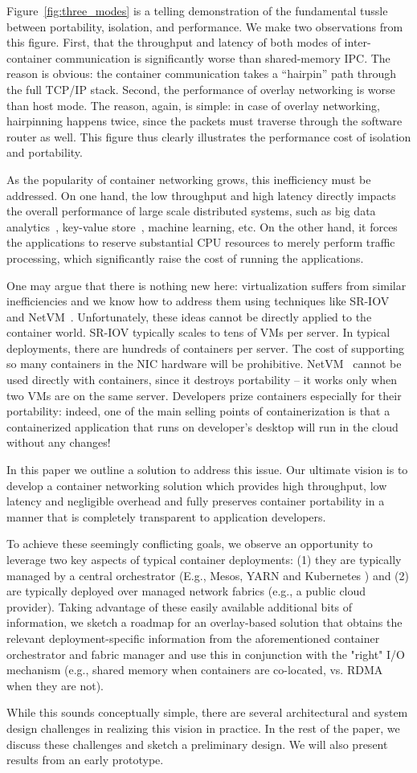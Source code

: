 Figure~\ref{fig:three_modes} is a telling demonstration of the fundamental
tussle between portability, isolation, and performance. We make two
observations from this figure. First, that the throughput and latency of both
modes of inter-container communication is significantly worse than
shared-memory IPC. The reason is obvious: the container communication takes a
``hairpin'' path through the full TCP/IP stack. Second, the performance of
overlay networking is worse than host mode. The reason, again, is simple: in
case of overlay networking, hairpinning happens twice, since the packets must
traverse through the software router as well. This figure thus clearly
illustrates the performance cost of isolation and portability.

As the popularity of container networking grows, this inefficiency must be
addressed. On one hand, the low throughput and high latency directly impacts the
overall performance of large scale distributed systems, such as big data
analytics~\cite{varys,orchestra,reining,chowdhury}, key-value
store~\cite{farm}, machine learning, etc. On the other hand,
it forces the applications to reserve substantial CPU resources to merely
perform traffic processing, which significantly raise the cost of running the
applications.

One may argue that there is nothing new here: virtualization suffers from
similar inefficiencies and we know how to address them using techniques like
SR-IOV~\cite{sriov} and NetVM~\cite{netvm}. Unfortunately, these ideas cannot be
directly applied to the container world.  SR-IOV typically scales to tens of VMs
per server. In typical deployments, there are hundreds of containers per server.
The cost of supporting so many containers in the NIC hardware will be
prohibitive.  NetVM~\cite{netvm} cannot be used directly with containers, since
it destroys portability -- it works only when two VMs are on the same server.
Developers prize containers especially for their portability: indeed, one of the
main selling points of containerization is that a containerized application that
runs on developer's desktop will run in the cloud without any changes! 

In this paper we outline a solution to address this issue.  Our ultimate vision
is to develop a container networking solution which provides high throughput,
low latency and negligible overhead and fully preserves container portability in
a manner that is completely transparent to application developers. 

To achieve these seemingly conflicting goals, we observe an opportunity to
leverage two key aspects of typical container deployments: (1) they are
typically managed by a central orchestrator (E.g., Mesos, YARN and Kubernetes
\cite{mesos,yarn,kubernetes}) and (2) are typically deployed over managed network
fabrics (e.g., a public cloud provider). Taking advantage of these easily
available additional bits of information, we sketch a roadmap for an
overlay-based solution  that obtains the relevant deployment-specific
information from the aforementioned container orchestrator and fabric manager
and use this in conjunction with the "right" I/O mechanism (e.g., shared memory
when containers are co-located, vs. RDMA when they are not). 

While this sounds conceptually simple, there are several architectural
and system design challenges in realizing this vision in practice. In the rest
of the paper, we discuss these challenges and sketch a preliminary design. We
will also present results from an early prototype.
